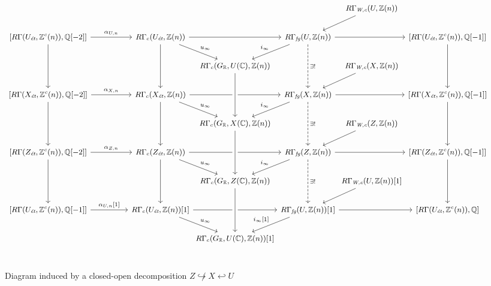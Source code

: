 \documentclass{article}
\numberwithin{equation}{section}
\begin{document}
\begin{landscape}
  \begin{figure}
    \[ \begin{tikzcd}[font=\small]
        &[2em] &[-2.5em] &[-2.5em] &[-2.5em] R\Gamma_\Wc (U, \ZZ (n))\ar{dl} &[-2.5em] \\
        {[R\Gamma (U_\et, \ZZ^c (n)), \QQ[-2]]} \ar{r}{\alpha_{U,n}}\ar{dd} & R\Gamma_c (U_\et, \ZZ (n)) \ar{dr}{u_\infty} \ar{dd} \ar{rr} & & R\Gamma_\fg (U, \ZZ (n))\ar{dl}[swap]{i_\infty} \ar[dashed]{dd}{\exists!} \ar[crossing over]{rr} & & {[R\Gamma (U_\et, \ZZ^c (n)), \QQ[-1]]} \ar{dd} \\
        & & R\Gamma_c (G_\RR, U (\CC), \ZZ (n)) & & R\Gamma_\Wc (X, \ZZ (n))\ar{dl} \\
        {[R\Gamma (X_\et, \ZZ^c (n)), \QQ[-2]]} \ar{r}{\alpha_{X,n}}\ar{dd} & R\Gamma_c (X_\et, \ZZ (n)) \ar{dr}{u_\infty} \ar{dd} \ar{rr} & & R\Gamma_\fg (X, \ZZ (n)) \ar{dl}[swap]{i_\infty} \ar[dashed]{dd}{\exists!} \ar[crossing over]{rr} & & {[R\Gamma (X_\et, \ZZ^c (n)), \QQ[-1]]} \ar{dd} \\
        & & R\Gamma_c (G_\RR, X (\CC), \ZZ (n)) \ar[<-,near end,crossing over]{uu} & & R\Gamma_\Wc (Z, \ZZ (n))\ar{dl} \\
        {[R\Gamma (Z_\et, \ZZ^c (n)), \QQ[-2]]} \ar{r}{\alpha_{Z,n}}\ar{dd} & R\Gamma_c (Z_\et, \ZZ (n)) \ar{dr}{u_\infty} \ar{dd} \ar{rr} & & R\Gamma_\fg (Z, \ZZ (n)) \ar{dl}[swap]{i_\infty} \ar[dashed]{dd}{\exists!} \ar[crossing over]{rr} & & {[R\Gamma (Z_\et, \ZZ^c (n)), \QQ[-1]]} \ar{dd} \\
        & & R\Gamma_c (G_\RR, Z (\CC), \ZZ (n)) \ar[<-,near end,crossing over]{uu} & & R\Gamma_\Wc (U, \ZZ (n)) [1]\ar{dl} \\
        {[R\Gamma (U_\et, \ZZ^c (n)), \QQ[-1]]} \ar{r}{\alpha_{U,n} [1]} & R\Gamma_c (U_\et, \ZZ (n)) [1] \ar{dr}{u_\infty} \ar{rr} & & R\Gamma_\fg (U, \ZZ (n)) [1] \ar{dl}[swap]{i_\infty [1]} \ar{rr} & & {[R\Gamma (U_\et, \ZZ^c (n)), \QQ]} \\
        & & R\Gamma_c (G_\RR, U (\CC), \ZZ (n)) [1] \ar[<-,near end,crossing over]{uu} \\
      \end{tikzcd} \]

    \caption{Diagram induced by a closed-open decomposition
      $Z \not\hookrightarrow X \hookleftarrow U$}
    \label{fig:RGamma-Wc-and-closed-open-decompositions}
  \end{figure}
\end{landscape}
\end{document}

